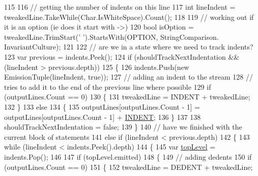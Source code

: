 \begin{DoxyCode}
115 
116                     \textcolor{comment}{// getting the number of indents on this line}
117                     \textcolor{keywordtype}{int} lineIndent = tweakedLine.TakeWhile(Char.IsWhiteSpace).Count();
118 
119                     \textcolor{comment}{// working out if it is an option (ie does it start with ->)}
120                     \textcolor{keywordtype}{bool} isOption = tweakedLine.TrimStart(\textcolor{charliteral}{' '}).StartsWith(OPTION, StringComparison.
      InvariantCulture);
121 
122                     \textcolor{comment}{// are we in a state where we need to track indents?}
123                     var previous = indents.Peek();
124                     \textcolor{keywordflow}{if} (shouldTrackNextIndentation && (lineIndent > previous.depth))
125                     \{
126                         indents.Push(\textcolor{keyword}{new} EmissionTuple(lineIndent, \textcolor{keyword}{true}));
127                         \textcolor{comment}{// adding an indent to the stream}
128                         \textcolor{comment}{// tries to add it to the end of the previous line where possible}
129                         \textcolor{keywordflow}{if} (outputLines.Count == 0)
130                         \{
131                             tweakedLine = INDENT + tweakedLine;
132                         \}
133                         \textcolor{keywordflow}{else}
134                         \{
135                             outputLines[outputLines.Count - 1] = outputLines[outputLines.Count - 1] + 
      \hyperlink{a00324_ae3f2190a793ab77428838e58e0e83676}{INDENT};
136                         \}
137 
138                         shouldTrackNextIndentation = \textcolor{keyword}{false};
139                     \}
140                     \textcolor{comment}{// have we finished with the current block of statements}
141                     \textcolor{keywordflow}{else} \textcolor{keywordflow}{if} (lineIndent < previous.depth)
142                     \{
143                         \textcolor{keywordflow}{while} (lineIndent < indents.Peek().depth)
144                         \{
145                             var \hyperlink{a00324_a8b7e5c0b2c6870eaa8f9454b4f33678b}{topLevel} = indents.Pop();
146 
147                             \textcolor{keywordflow}{if} (topLevel.emitted)
148                             \{
149                                 \textcolor{comment}{// adding dedents}
150                                 \textcolor{keywordflow}{if} (outputLines.Count == 0)
151                                 \{
152                                     tweakedLine = DEDENT + tweakedLine;

\end{DoxyCode}
